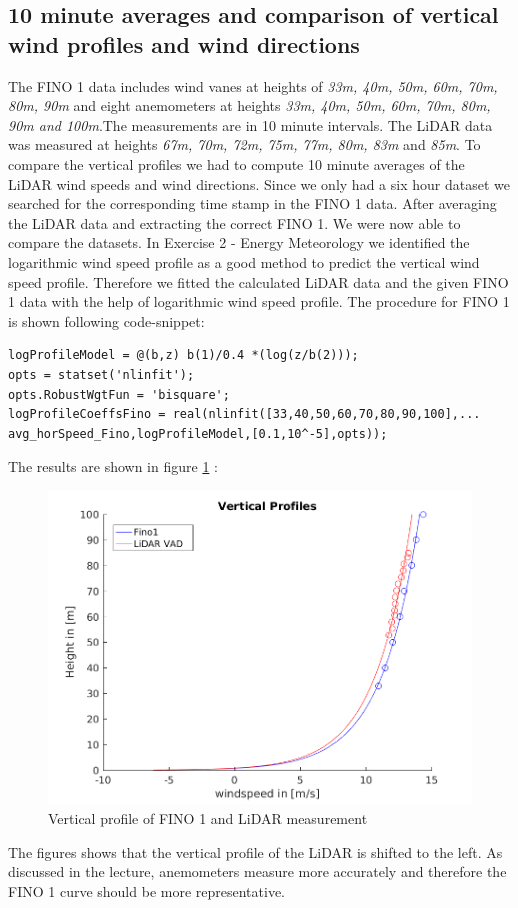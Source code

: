 \documentclass[10pt]{article}
\begin{document}
\subsection{10 minute averages and comparison of vertical wind profiles and wind directions}
The FINO 1 data includes wind vanes at heights of \textit{33m, 40m, 50m, 60m, 70m, 80m, 90m} and eight anemometers at heights \textit{33m, 40m, 50m, 60m, 70m, 80m, 90m and 100m}.The measurements are in 10 minute intervals. The LiDAR data was measured at heights \textit{67m, 70m, 72m, 75m, 77m, 80m,	83m} and \textit{85m}.
To compare the vertical profiles we had to compute 10 minute averages of the LiDAR wind speeds and wind directions. Since we only had a six hour dataset we searched for the corresponding time stamp in the FINO 1 data. After averaging the LiDAR data and extracting the correct FINO 1. We were now able to compare the datasets. 
In Exercise 2 - Energy Meteorology we identified the logarithmic wind speed profile as a good method to predict the vertical wind speed profile.
Therefore we fitted the calculated LiDAR data and the given FINO 1 data with the help of logarithmic wind speed profile. 
The procedure for FINO 1 is shown following code-snippet:
\begin{lstlisting}
logProfileModel = @(b,z) b(1)/0.4 *(log(z/b(2)));
opts = statset('nlinfit');
opts.RobustWgtFun = 'bisquare';
logProfileCoeffsFino = real(nlinfit([33,40,50,60,70,80,90,100],...
avg_horSpeed_Fino,logProfileModel,[0.1,10^-5],opts));
\end{lstlisting}
The results are shown in figure \ref{fig:verticalprofiles} :
\begin{figure}[H]
\includegraphics[width=1\linewidth]{../Exercises_and_Tasks/ex2/figures/verticalProfiles.png}
\caption{Vertical profile of FINO 1 and LiDAR measurement}
\label{fig:verticalprofiles}
\end{figure}
The figures shows that the vertical profile of the LiDAR is shifted to the left. As discussed in the lecture, anemometers measure more accurately and therefore the FINO 1 curve should be more representative. 
\end{document}
